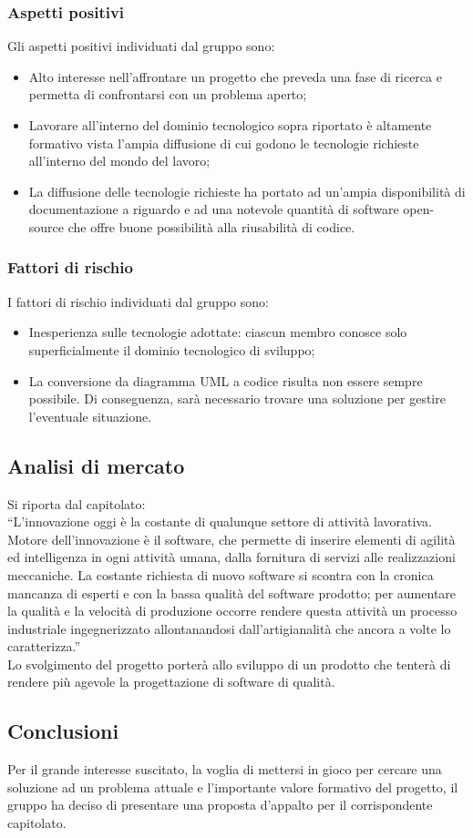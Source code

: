 \documentclass[../StudioDiFattibilita.tex]{subfiles}
\begin{document}
			\subsubsection{Aspetti positivi}
				Gli aspetti positivi individuati dal gruppo sono:
				\begin{itemize}
					\item Alto interesse nell'affrontare un progetto che preveda una fase di ricerca e permetta
					di confrontarsi con un problema aperto;
					\item Lavorare all'interno del dominio tecnologico sopra riportato è altamente formativo
					vista l'ampia diffusione di cui godono le tecnologie richieste all'interno del mondo del
					lavoro;
					\item La diffusione delle tecnologie richieste ha portato ad un'ampia disponibilità di
					documentazione a riguardo e ad una notevole quantità di software open-source che offre buone
					possibilità alla riusabilità di codice.
				\end{itemize}
			\subsubsection{Fattori di rischio}
				I fattori di rischio individuati dal gruppo sono:
				\begin{itemize}
					\item Inesperienza sulle tecnologie adottate: ciascun membro conosce solo superficialmente il
					dominio tecnologico di sviluppo;
					\item La conversione da diagramma UML a codice risulta non essere sempre possibile.	Di
					conseguenza, sarà necessario trovare una soluzione per gestire l'eventuale situazione.
				\end{itemize}
		\subsection{Analisi di mercato}
			Si riporta dal capitolato:\\
			``L'innovazione oggi è la costante di qualunque settore di attività lavorativa. Motore
			dell'innovazione è il software, che permette di inserire elementi di agilità ed intelligenza in ogni
			attività umana, dalla fornitura di servizi alle realizzazioni meccaniche. La costante richiesta di
			nuovo software si scontra con la cronica mancanza di esperti e con la bassa qualità del software
			prodotto; per aumentare la qualità e la velocità di produzione occorre rendere questa attività un
			processo industriale ingegnerizzato allontanandosi dall'artigianalità che ancora a volte lo
			caratterizza.''\\
			Lo svolgimento del progetto porterà allo sviluppo di un prodotto che tenterà di rendere più agevole
			la progettazione di software di qualità.
		\subsection{Conclusioni}
			Per il grande interesse suscitato, la voglia di mettersi in gioco per cercare una soluzione ad un
			problema attuale e l'importante valore formativo del progetto, il gruppo ha deciso di presentare una
			proposta d'appalto per il corrispondente capitolato.
\end{document}
